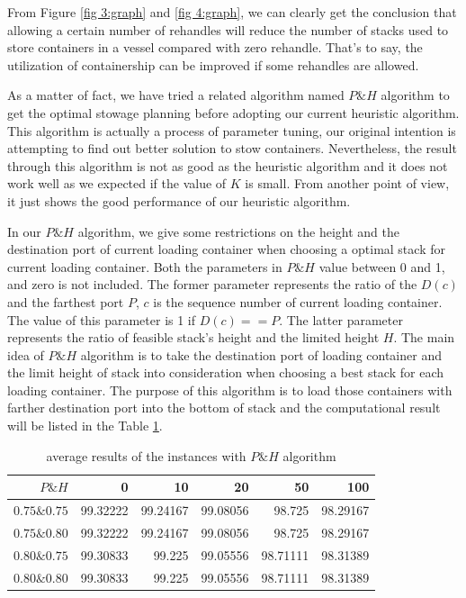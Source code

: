 \documentclass[review,3p,times,authoryear,12pt]{elsarticle}
\begin{document}
From Figure \ref{fig 3:graph} and \ref{fig 4:graph}, we can clearly get the conclusion that allowing a certain number of rehandles will reduce the number of stacks used to store containers in a vessel compared with zero rehandle.
That's to say, the utilization of containership can be improved if some rehandles are allowed.

As a matter of fact, we have tried a related algorithm named $P\&H$ algorithm to get the optimal stowage planning before adopting our current heuristic algorithm.
This algorithm is actually a process of parameter tuning, our original intention is attempting to find out better solution to stow containers.
Nevertheless, the result through this algorithm is not as good as the heuristic algorithm and it does not work well as we expected if the value of $K$ is small.
From another point of view, it just shows the good performance of our heuristic algorithm.

In our $P\&H$ algorithm, we give some restrictions on the height and the destination port of current loading container when choosing a  optimal stack for current loading container.
Both the parameters in $P\&H$ value between 0 and 1, and zero is not included.
The former parameter represents the ratio of the $D(c)$ and the farthest port $P$, $c$ is the sequence number of current loading container.
The value of this parameter is 1 if $D(c)==P$.
The latter parameter represents the ratio of feasible stack's height and the limited height $H$.
The main idea of $P\&H$ algorithm is to take the destination port of loading container and the limit height of stack into consideration when choosing a best stack for each loading container.
The purpose of this algorithm is to load those containers with farther destination port into the bottom of stack and the computational result will be listed in the Table \ref{tab:5}.

\begin{table}[htbp]
  \centering
  \setlength{\belowcaptionskip}{10pt}
  \caption{average results of the instances with $P\&H$ algorithm}
    \begin{tabular}{r|r|r|r|r|r}
    \hline
     $P\&H$       &0   &10  &20  &50  &100\\
    \hline
    $0.75\&0.75$   &99.32222  &99.24167  &99.08056   &98.725  &98.29167\\
    \hline
    $0.75\&0.80$   &99.32222  &99.24167  &99.08056   &98.725  &98.29167\\
    \hline
    $0.80\&0.75$   &99.30833  &99.225  &99.05556   &98.71111  &98.31389\\
    \hline
    $0.80\&0.80$    &99.30833  &99.225  &99.05556   &98.71111  &98.31389\\
    \hline
    \end{tabular}
  \label{tab:5}
\end{table}
\end{document}
